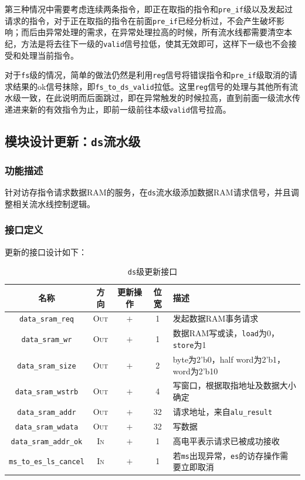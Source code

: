 \documentclass[UTF-8,twoside,c5size]{ctexart}
\begin{document}
	第三种情况中需要考虑连续两条指令，即正在取指的指令和\texttt{pre_if}级以及发起过请求的指令，对于正在取指的指令在前面\texttt{pre_if}已经分析过，不会产生破坏影响；而后由异常处理的需求，在异常处理拉高的时候，所有流水线都需要清空本纪，方法是将去往下一级的\texttt{valid}信号拉低，使其无效即可，这样下一级也不会接受和处理当前指令。
	
	对于\texttt{fs}级的情况，简单的做法仍然是利用\texttt{reg}信号将错误指令和\texttt{pre_if}级取消的请求结果的ok信号抹除，即\texttt{fs_to_ds_valid}拉低。这里\texttt{reg}信号的处理与其他所有流水级一致，在此说明而后面跳过，即在异常触发的时候拉高，直到前面一级流水传递进来新的有效指令为止，即前一级前往本级\texttt{valid}信号拉高。
	
	\subsection{模块设计更新：\texttt{ds}流水级}
	
	\subsubsection{功能描述}
	
	针对访存指令请求数据RAM的服务，在\texttt{ds}流水级添加数据RAM请求信号，并且调整相关流水线控制逻辑。
	
	\subsubsection{接口定义}
	
	更新的接口设计如下：
	
	\begin{table}[!h]
		\begin{center}
			\caption{\texttt{ds}级更新接口}
			\begin{tabularx}{\textwidth}{|c|c|c|c|Y|}
				\hline
				\textbf{名称} & \textbf{方向} & \textbf{更新操作} & \textbf{位宽} & \textbf{描述} \\
				\hline
				\texttt{data_sram_req} & \textsc{Out} & $+$ & 1 & 发起数据RAM事务请求 \\
				\hline
				\texttt{data_sram_wr} & \textsc{Out} & $+$ & 1 & 数据RAM写或读，\texttt{load}为0，\texttt{store}为1 \\
				\hline
				\texttt{data_sram_size} & \textsc{Out} & $+$ & 2 & byte为2'b0，half word为2'b1，word为2'b10 \\
				\hline
				\texttt{data_sram_wstrb} & \textsc{Out} & $+$ & 4 & 写窗口，根据取指地址及数据大小确定 \\
				\hline
				\texttt{data_sram_addr} & \textsc{Out} & $+$ & 32 & 请求地址，来自\texttt{alu_result} \\
				\hline
				\texttt{data_sram_wdata} & \textsc{Out} & $+$ & 32 & 写数据 \\
				\hline
				\texttt{data_sram_addr_ok} & \textsc{In} & $+$ & 1 & 高电平表示请求已被成功接收 \\
				\hline
				\texttt{ms_to_es_ls_cancel} & \textsc{In} & $+$ & 1 & 若\texttt{ms}出现异常，\texttt{es}的访存操作需要立即取消 \\
				\hline
			\end{tabularx}
		\end{center}
	\end{table}
\end{document}
